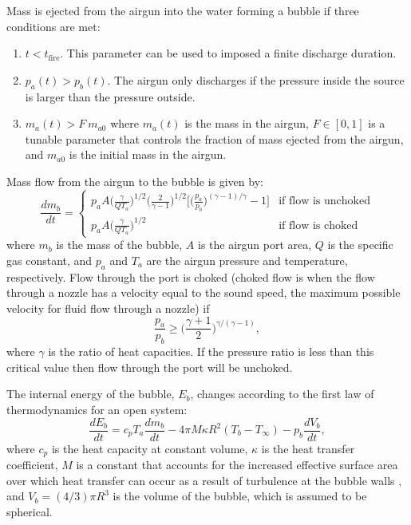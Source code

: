 \documentclass[10pt]{article}
\begin{document}
Mass is ejected from the airgun into the water forming a bubble if three conditions are met:
\begin{enumerate}
\item $t < t_\text{fire}$. This parameter can be used to imposed a finite discharge duration.
\item $p_a(t) > p_b(t)$. The airgun only discharges if the pressure inside the source is larger than the pressure outside.
\item $m_a(t) > F ~ m_{a0}$ where $m_a(t)$ is the mass in the airgun, $F\in[0,1]$ is a tunable parameter that controls the fraction of mass ejected from the airgun, and $m_{a0}$ is the initial mass in the airgun.
\end{enumerate}
Mass flow from the airgun to the bubble is given by:
\begin{equation}
\frac{dm_b}{dt} = 
  \begin{cases} 
   p_a A \big( \frac{\gamma}{QT_a} \big)^{1/2} \big( \frac{2}{\gamma-1}\big)^{1/2} \bigg[ \big( \frac{p_a}{p_b}\big)^{(\gamma-1)/\gamma} - 1\bigg] & \text{if flow is unchoked}  \\
   p_a A \big( \frac{\gamma}{QT_a} \big)^{1/2}       & \text{if flow is choked} 
  \end{cases}
\end{equation}
where $m_b$ is the mass of the bubble, $A$ is the airgun port area, $Q$ is the specific gas constant, and $p_a$ and $T_a$ are the airgun pressure and temperature, respectively. Flow through the port is choked (choked flow is when the flow through a nozzle has a velocity equal to the sound speed, the maximum possible velocity for fluid flow through a nozzle) if \citep{Babu2014}
\begin{equation}
\frac{p_a}{p_b} \geq \bigg( \frac{\gamma+1}{2}\bigg)^{\gamma/(\gamma-1)},
\end{equation}
where $\gamma$ is the ratio of heat capacities. If the pressure ratio is less than this critical value then flow through the port will be unchoked. 

The internal energy of the bubble, $E_b$, changes according to the first law of thermodynamics for an open system:
\begin{equation}
\frac{dE_b}{dt} = c_p T_a \frac{dm_b}{dt} - 4 \pi M \kappa R^2 (T_b - T_\infty) - p_b \frac{dV_b}{dt},
\end{equation}
where $c_p$ is the heat capacity at constant volume, $\kappa$ is the heat transfer coefficient, $M$ is a constant that accounts for the increased effective surface area over which heat transfer can occur as a result of turbulence at the bubble walls \citep{Laws1990}, and $V_b = (4/3) \pi R^3$ is the volume of the bubble, which is assumed to be spherical.
\end{document}
